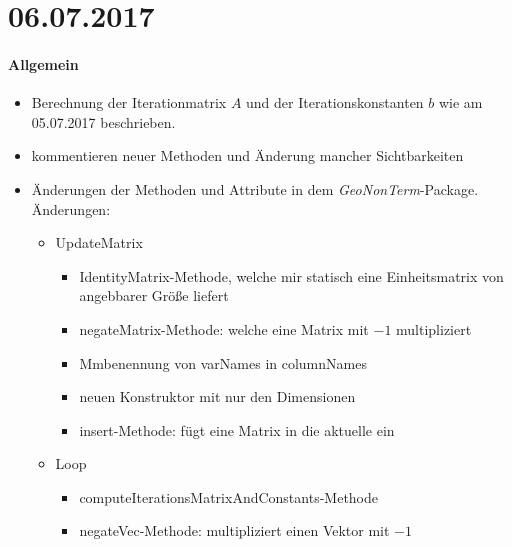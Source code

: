 \section*{06.07.2017}

\paragraph{Allgemein}
\begin{itemize}
	\item Berechnung der Iterationmatrix $A$ und der Iterationskonstanten $b$ wie am 05.07.2017 beschrieben.
	\item kommentieren neuer Methoden und Änderung mancher Sichtbarkeiten
	\item Änderungen der Methoden und Attribute in dem \emph{GeoNonTerm}-Package. Änderungen:
		\begin{itemize}
			\item UpdateMatrix	
				\begin{itemize}
					\item IdentityMatrix-Methode, welche mir statisch eine Einheitsmatrix von angebbarer Größe liefert
					\item negateMatrix-Methode: welche eine Matrix mit $-1$ multipliziert
					\item Mmbenennung von varNames in columnNames
					\item neuen Konstruktor mit nur den Dimensionen
					\item insert-Methode: fügt eine Matrix in die aktuelle ein
				\end{itemize}
			\item Loop
				\begin{itemize}
					\item computeIterationsMatrixAndConstants-Methode
					\item negateVec-Methode: multipliziert einen Vektor mit $-1$
				\end{itemize}
		\end{itemize}
\end{itemize}